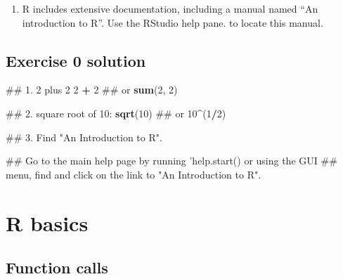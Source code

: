 \documentclass[]{book}
\newenvironment{Shaded}{\begin{snugshade}}{\end{snugshade}}
\newcommand{\KeywordTok}[1]{\textcolor[rgb]{0.13,0.29,0.53}{\textbf{#1}}}
\newcommand{\DecValTok}[1]{\textcolor[rgb]{0.00,0.00,0.81}{#1}}
\newcommand{\StringTok}[1]{\textcolor[rgb]{0.31,0.60,0.02}{#1}}
\newcommand{\OperatorTok}[1]{\textcolor[rgb]{0.81,0.36,0.00}{\textbf{#1}}}
\newcommand{\NormalTok}[1]{#1}
\providecommand{\tightlist}{%
  \setlength{\itemsep}{0pt}\setlength{\parskip}{0pt}}
\begin{document}
\begin{enumerate}
\def\labelenumi{\arabic{enumi}.}
\setcounter{enumi}{2}
\tightlist
\item
  R includes extensive documentation, including a manual named ``An
  introduction to R''. Use the RStudio help pane. to locate this manual.
\end{enumerate}

\subsection{Exercise 0 solution}\label{exercise-0-solution}

\begin{Shaded}
\begin{Highlighting}[]
\NormalTok{## 1. 2 plus 2}
\DecValTok{2} \OperatorTok{+}\StringTok{ }\DecValTok{2}
\NormalTok{## or}
\KeywordTok{sum}\NormalTok{(}\DecValTok{2}\NormalTok{, }\DecValTok{2}\NormalTok{)}
\end{Highlighting}
\end{Shaded}

\begin{Shaded}
\begin{Highlighting}[]
\NormalTok{## 2. square root of 10:}
\KeywordTok{sqrt}\NormalTok{(}\DecValTok{10}\NormalTok{)}
\NormalTok{## or}
\DecValTok{10}\OperatorTok{^}\NormalTok{(}\DecValTok{1}\OperatorTok{/}\DecValTok{2}\NormalTok{)}
\end{Highlighting}
\end{Shaded}

\begin{Shaded}
\begin{Highlighting}[]
\NormalTok{## 3. Find "An Introduction to R".}
\end{Highlighting}
\end{Shaded}

\begin{Shaded}
\begin{Highlighting}[]
\NormalTok{## Go to the main help page by running 'help.start() or using the GUI}
\NormalTok{## menu, find and click on the link to "An Introduction to R".}
\end{Highlighting}
\end{Shaded}

\section{R basics}\label{r-basics}

\subsection{Function calls}\label{function-calls}
\end{document}
